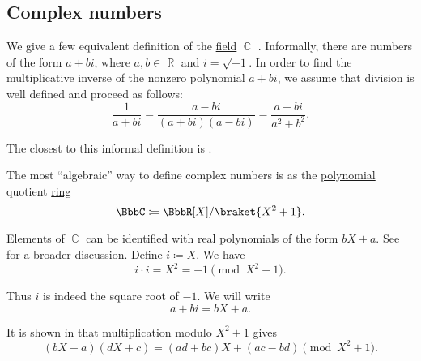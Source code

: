 \subsection{Complex numbers}\label{subsec:complex_numbers}

\begin{definition}\label{def:complex_numbers}
  We give a few equivalent definition of the \hyperref[def:field]{field} \( \BbbC \) . Informally, there are numbers of the form \( a + bi \), where \( a, b \in \BbbR \) and \( i = \sqrt{-1} \). In order to find the multiplicative inverse of the nonzero polynomial \( a + bi \), we assume that division is well defined and proceed as follows:
  \begin{equation}\label{def:complex_numbers/inverse}
    \frac 1 {a + bi} = \frac {a - bi} {(a + bi)(a - bi)} = \frac{a - bi}{a^2 + b^2}.
  \end{equation}

  The closest to this informal definition is .

  \begin{defenum}
     The most \enquote{algebraic} way to define complex numbers is as the \hyperref[def:polynomial]{polynomial} quotient \hyperref[thm:polynomial_quotient_rings_equinumerous_with_module_of_polynomials]{ring}
    \begin{equation*}
      \BbbC \coloneqq \BbbR[X] / \braket{X^2 + 1}.
    \end{equation*}

    Elements of \( \BbbC \) can be identified with real polynomials of the form \( bX + a \). See  for a broader discussion.
    Define \( i \coloneqq X \). We have
    \begin{equation*}
      i \cdot i = X^2 = -1 \pmod {X^2 + 1}.
    \end{equation*}

    Thus \( i \) is indeed the square root of \( -1 \). We will write
    \begin{equation*}
      a + bi = bX + a.
    \end{equation*}

    It is shown in  that multiplication modulo \( X^2 + 1 \) gives
    \begin{equation}\label{def:complex_numbers/polynomials/multiplication}
      (bX + a) (dX + c) = (ad + bc)X + (ac - bd) \pmod {X^2 + 1}.
    \end{equation}


\end{defenum}
\end{definition}
